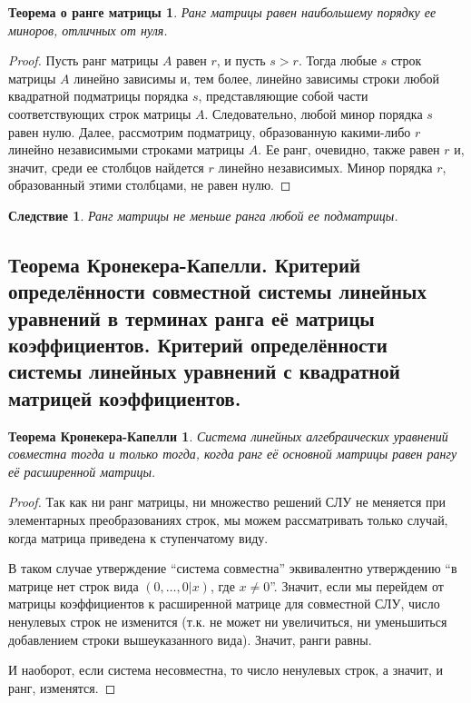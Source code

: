 \documentclass[a4paper, 12pt]{article}
\newtheorem*{que49theorem}{Теорема о ранге матрицы}
\newtheorem*{Kroneker}{Теорема Кронекера-Капелли}
\newtheorem*{que49cons}{Следствие}
\begin{document}
\begin{que49theorem}
Ранг матрицы равен наибольшему порядку ее миноров, отличных от нуля.
\end{que49theorem}

\begin{proof}
Пусть ранг матрицы $A$ равен $r$, и пусть $s > r$. Тогда любые $s$ строк матрицы $A$ линейно зависимы и, тем более, линейно зависимы строки любой квадратной подматрицы порядка $s$, представляющие собой части соответствующих строк матрицы $A$. Следовательно, любой минор порядка $s$ равен нулю. Далее, рассмотрим подматрицу, образованную какими-либо $r$ линейно независимыми строками матрицы $A$. Ее ранг, очевидно, также равен $r$ и, значит, среди ее столбцов найдется $r$ линейно независимых. Минор порядка $r$, образованный этими столбцами, не равен нулю.
\end{proof}

\begin{que49cons}
Ранг матрицы не меньше ранга любой ее подматрицы.
\end{que49cons}

\subsection{Теорема Кронекера-Капелли. Критерий определённости совместной системы линейных уравнений в терминах ранга её матрицы коэффициентов. Критерий определённости системы линейных уравнений с квадратной матрицей коэффициентов.}
\begin{Kroneker}
    Система линейных алгебраических уравнений совместна тогда и только тогда, когда ранг её основной матрицы равен рангу её расширенной матрицы.
\end{Kroneker}
\begin{proof}
    Так как ни ранг матрицы, ни множество решений СЛУ не меняется при элементарных преобразованиях строк, мы можем рассматривать только случай, когда матрица приведена к ступенчатому виду.
    
    В таком случае утверждение ``система совместна'' эквивалентно утверждению ``в матрице нет строк вида $(0,\ldots, 0|x)$, где $x \neq 0$''. Значит, если мы перейдем от матрицы коэффициентов к расширенной матрице для совместной СЛУ, число ненулевых строк не изменится (т.к. не может ни увеличиться, ни уменьшиться добавлением строки вышеуказанного вида).
    Значит, ранги равны.
    
    И наоборот, если система несовместна, то число ненулевых строк, а значит, и ранг, изменятся.
\end{proof}
\end{document}
